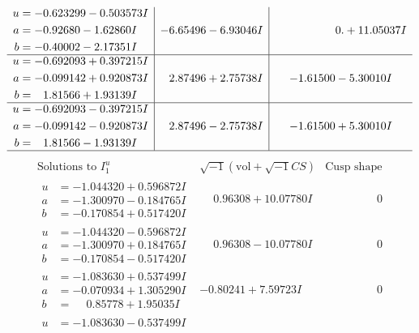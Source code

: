 \documentclass[1p]{elsarticle_modified}
\theoremstyle{definition}
\newcommand{\I}{\sqrt{-1}}
\begin{document}
$$\begin{array}{c|c|c}
\begin{aligned}
u &= -0.623299 - 0.503573 I \\
a &= -0.92680 - 1.62860 I \\
b &= -0.40002 - 2.17351 I\end{aligned}
 & -6.65496 - 6.93046 I & \phantom{-0.000000 -}0. + 11.05037 I \\ \hline\begin{aligned}
u &= -0.692093 + 0.397215 I \\
a &= -0.099142 + 0.920873 I \\
b &= \phantom{-}1.81566 + 1.93139 I\end{aligned}
 & \phantom{-}2.87496 + 2.75738 I & -1.61500 - 5.30010 I \\ \hline\begin{aligned}
u &= -0.692093 - 0.397215 I \\
a &= -0.099142 - 0.920873 I \\
b &= \phantom{-}1.81566 - 1.93139 I\end{aligned}
 & \phantom{-}2.87496 - 2.75738 I & -1.61500 + 5.30010 I\\
 \hline 
 \end{array}$$\newpage$$\begin{array}{c|c|c}  
\text{Solutions to }I^u_{1}& \I (\text{vol} + \sqrt{-1}CS) & \text{Cusp shape}\\
 \hline 
\begin{aligned}
u &= -1.044320 + 0.596872 I \\
a &= -1.300970 - 0.184765 I \\
b &= -0.170854 + 0.517420 I\end{aligned}
 & \phantom{-}0.96308 + 10.07780 I & \phantom{-0.000000 } 0 \\ \hline\begin{aligned}
u &= -1.044320 - 0.596872 I \\
a &= -1.300970 + 0.184765 I \\
b &= -0.170854 - 0.517420 I\end{aligned}
 & \phantom{-}0.96308 - 10.07780 I & \phantom{-0.000000 } 0 \\ \hline\begin{aligned}
u &= -1.083630 + 0.537499 I \\
a &= -0.070934 + 1.305290 I \\
b &= \phantom{-}0.85778 + 1.95035 I\end{aligned}
 & -0.80241 + 7.59723 I & \phantom{-0.000000 } 0 \\ \hline\begin{aligned}
u &= -1.083630 - 0.537499 I \\

\end{aligned}
\end{array}$$
\end{document}
